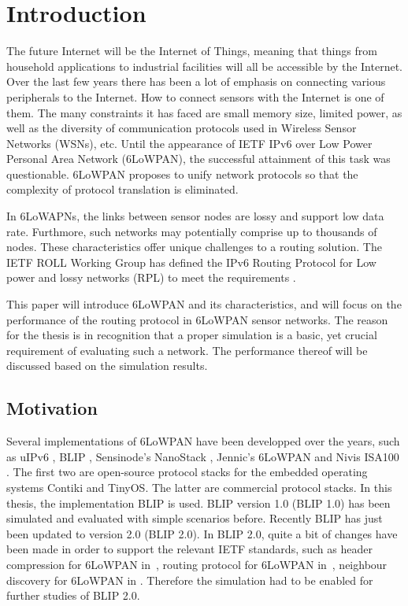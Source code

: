 \chapter{Introduction}
\label{1.0 Intr}

The future Internet will be the Internet of Things, meaning that things from household
applications to industrial facilities will all be accessible by the Internet. Over the last few years there has been a lot of emphasis on connecting various peripherals to the Internet. How to connect sensors with the Internet is one of them. The many constraints it has faced are small memory size, limited power,  as well as the diversity of communication protocols used in Wireless Sensor Networks (WSNs)\@, etc. Until the appearance of IETF IPv6 over Low Power Personal Area Network (6LoWPAN)\@, the successful attainment of this task was questionable. 6LoWPAN proposes to unify network protocols so that the complexity of protocol translation is eliminated. 
\newline

In 6LoWAPNs, the links between sensor nodes are lossy and support low data rate. Furthmore, such networks may potentially comprise up to thousands of nodes. These characteristics offer unique challenges to a routing solution. The IETF ROLL Working Group has defined the IPv6 Routing Protocol for Low power and lossy networks (RPL) to meet the requirements \cite{draft-ietf-roll-rpl-19}.
\newline

This paper will introduce 6LoWPAN and its characteristics, and will focus on the performance of the routing protocol in 6LoWPAN sensor networks. The reason for the thesis is in recognition that a proper simulation is a basic, yet crucial requirement of evaluating such a network. The performance thereof will be discussed based on the simulation results.

\section{Motivation}
\label{Intr:Motiv}

Several implementations of 6LoWPAN have been developped over the years, such as uIPv6 \cite{uIPv6}, BLIP \cite{BLIP}, Sensinode's NanoStack \cite{Sensinode}, Jennic's 6LoWPAN \cite{Jennic} and Nivis ISA100 \cite{Nivis}. The first two are open-source protocol stacks for the embedded operating systems Contiki and TinyOS. The latter are commercial protocol stacks. In this thesis, the implementation BLIP is used. BLIP version 1.0 (BLIP 1.0) has been simulated and evaluated with simple scenarios before. Recently BLIP has just been updated to version 2.0 (BLIP 2.0)\@. In BLIP 2.0, quite a bit of changes have been made in order to support the relevant IETF standards, such as header compression for 6LoWPAN in~\cite{draft-ietf-6lowpan-hc-15}, routing protocol for 6LoWPAN in~\cite{draft-ietf-roll-rpl-19}, neighbour discovery for 6LoWPAN in \cite{draft-ietf-6lowpan-nd-15}. 
Therefore the simulation had to be enabled for further studies of BLIP 2.0. 
\newline

